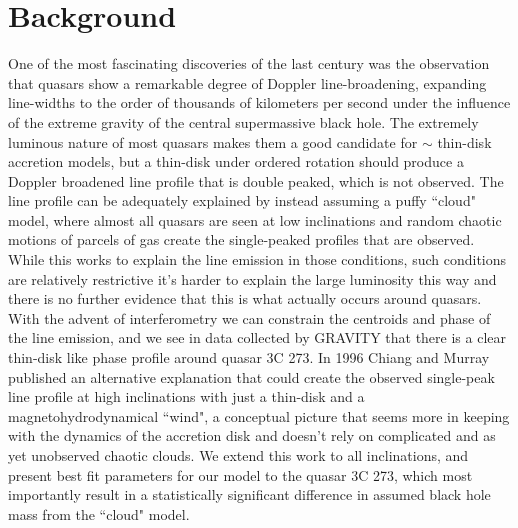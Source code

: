 \documentclass[12pt, a4paper]{article}
\begin{document}


\maketitle
\begin{abstract}
  \abstractText
  \newline
  \newline
\end{abstract}


\section{Background}
One of the most fascinating discoveries of the last century was the observation that quasars show a remarkable degree of Doppler line-broadening, expanding line-widths to the order of thousands of kilometers per second under the influence of the extreme gravity of the central supermassive black hole. The extremely luminous nature of most quasars makes them a good candidate for $\sim$ thin-disk accretion models, but a thin-disk under ordered rotation should produce a Doppler broadened line profile that is double peaked, which is not observed. The line profile can be adequately explained by instead assuming a puffy ``cloud" model, where almost all quasars are seen at low inclinations and random chaotic motions of parcels of gas create the single-peaked profiles that are observed. While this works to explain the line emission in those conditions, such conditions are relatively restrictive \textemdash it's harder to explain the large luminosity this way \textemdash and there is no further evidence that this is what actually occurs around quasars. With the advent of interferometry we can constrain the centroids and phase of the line emission, and we see in data collected by GRAVITY that there is a clear thin-disk like phase profile around quasar 3C 273. In 1996 Chiang and Murray published an alternative explanation that could create the observed single-peak line profile at high inclinations with just a thin-disk and a magnetohydrodynamical ``wind", a conceptual picture that seems more in keeping with the dynamics of the accretion disk and doesn't rely on complicated and as yet unobserved chaotic clouds. We extend this work to all inclinations, and present best fit parameters for our model to the quasar 3C 273, which most importantly result in a statistically significant difference in assumed black hole mass from the ``cloud" model.
\end{document}
